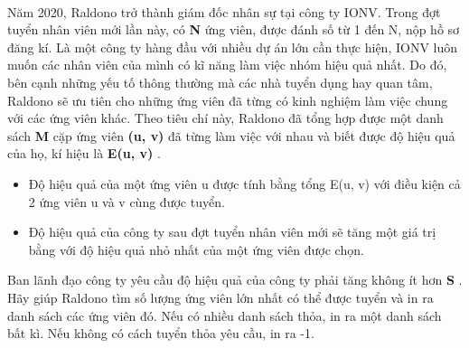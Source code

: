  

Năm 2020, Raldono trở thành giám đốc nhân sự tại công ty IONV. Trong đợt tuyển nhân viên mới lần này, có \textbf{ N } ứng viên, được đánh số từ 1 đến N, nộp hồ sơ đăng kí. Là một công ty hàng đầu với nhiều dự án lớn cần thực hiện, IONV luôn muốn các nhân viên của mình có kĩ năng làm việc nhóm hiệu quả nhất. Do đó, bên cạnh những yếu tố thông thường mà các nhà tuyển dụng hay quan tâm, Raldono sẽ ưu tiên cho những ứng viên đã từng có kinh nghiệm làm việc chung với các ứng viên khác. Theo tiêu chí này, Raldono đã tổng hợp được một danh sách \textbf{ M } cặp ứng viên \textbf{ (u, v) } đã từng làm việc với nhau và biết được độ hiệu quả của họ, kí hiệu là \textbf{ E(u, v) } .
\begin{itemize}
	\item Độ hiệu quả của một ứng viên u được tính bằng tổng E(u, v) với điều kiện cả 2 ứng viên u và v cùng được tuyển.
	\item Độ hiệu quả của công ty sau đợt tuyển nhân viên mới sẽ tăng một giá trị bằng với độ hiệu quả nhỏ nhất của một ứng viên được chọn.
\end{itemize}

Ban lãnh đạo công ty yêu cầu độ hiệu quả của công ty phải tăng không ít hơn \textbf{ S } . Hãy giúp Raldono tìm số lượng ứng viên lớn nhất có thể được tuyển và in ra danh sách các ứng viên đó. Nếu có nhiều danh sách thỏa, in ra một danh sách bất kì. Nếu không có cách tuyển thỏa yêu cầu, in ra -1.